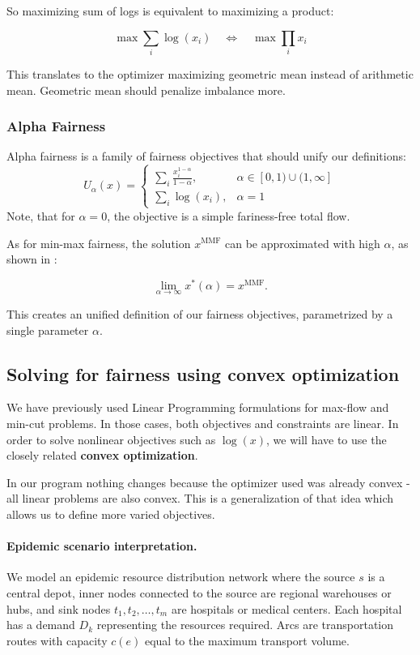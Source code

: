 \documentclass[12pt, openany]{article}
\begin{document}
So maximizing sum of logs is equivalent to maximizing a product:

\[
\max \sum_i \log(x_i)
\quad\Longleftrightarrow\quad
\max \prod_i x_i
\]

This translates to the optimizer maximizing geometric mean instead of arithmetic mean. Geometric mean should penalize imbalance more.

\subsubsection{Alpha Fairness}
Alpha fairness is a family of fairness objectives that should unify our definitions:
\[
U_\alpha(x)=
\begin{cases}
\displaystyle \sum_i \frac{x_i^{1-\alpha}}{1-\alpha},
& \alpha \in [0,1)\cup(1,\infty] \\[1 em]
\displaystyle \sum_i \log(x_i),
& \alpha = 1
\end{cases}
\]
Note, that for $\alpha = 0$, the objective is a simple fariness-free total flow.

As for min-max fairness, the solution \(x^{\mathrm{MMF}}\) can be approximated with high $\alpha$, as shown in \cite{mo2000fair}:

\[
\lim_{\alpha \to \infty}
x^*(\alpha)
=
x^{\mathrm{MMF}}.
\]

This creates an unified definition of our fairness objectives, parametrized by a single parameter $\alpha$.

\subsection{Solving for fairness using convex optimization}

We have previously used Linear Programming formulations for max-flow and min-cut problems. In those cases, both objectives and constraints are linear. In order to solve nonlinear objectives such as $\log(x)$, we will have to use the closely related \textbf{convex optimization}.

In our program nothing changes because the optimizer used was already convex - all linear problems are also convex. This is a generalization of that idea which allows us to define more varied objectives.

 
\paragraph{Epidemic scenario interpretation.} We model an epidemic resource distribution network where the source $s$ is a central depot, inner nodes connected to the source are regional warehouses or hubs, and sink nodes $t_1, t_2, \dots, t_m$ are hospitals or medical centers. Each hospital has a demand $D_k$ representing the resources required. Arcs are transportation routes with capacity $c(e)$ equal to the maximum transport volume.
\end{document}
